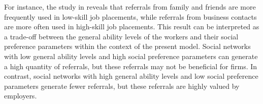 \documentclass[12pt]{article}
\begin{document}

For instance, the study in \cite{lester2021heterogeneous} reveals that referrals from family and friends are more frequently used in low-skill job placements, while referrals from business contacts are more often used in high-skill job placements. This result can be interpreted as a trade-off between the general ability levels of the workers and their social preference parameters within the context of the present model. Social networks with low general ability levels and high social preference parameters can generate a high quantity of referrals, but these referrals may not be beneficial for firms. In contrast, social networks with high general ability levels and low social preference parameters generate fewer referrals, but these referrals are highly valued by employers.
\end{document}
